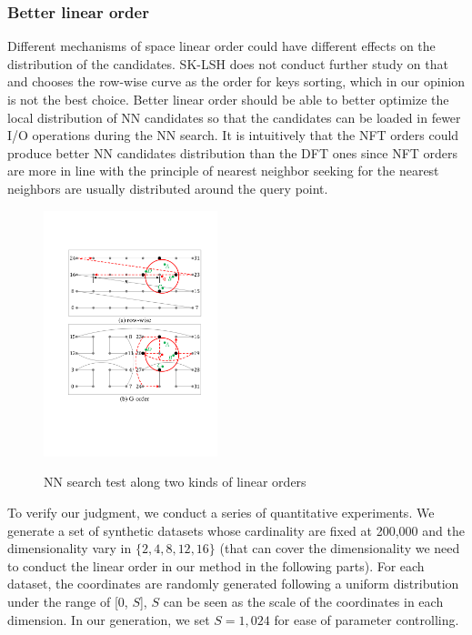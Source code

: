 \documentclass[twocolumn]{svjour3}          %
\begin{document}
\subsubsection{Better linear order}\label{sssec:anaorder}
Different mechanisms of space linear order could have different effects on the distribution of the candidates. SK-LSH does not conduct further study on that and chooses the row-wise curve as the order for keys sorting, which in our opinion is not the best choice. Better linear order should be able to better optimize the local distribution of NN candidates so that the candidates can be loaded in fewer I/O operations during the NN search. It is intuitively that the NFT orders could produce better NN candidates distribution than the DFT ones since NFT orders are more in line with the principle of nearest neighbor seeking for the nearest neighbors are usually distributed around the query point.
\begin{figure}[t]
	\centering
	\includegraphics[width=0.45\textwidth]{order-compare.pdf}\\
	\caption{NN search test along two kinds of linear orders}\label{fig:nncompare}
\end{figure}

To verify our judgment, we conduct a series of quantitative experiments.
We generate a set of synthetic datasets whose cardinality are fixed at 200,000 and the dimensionality vary in $\{2,4,8,12,16\}$ (that can cover the dimensionality we need to conduct the linear order in our method in the following parts). For each dataset, the coordinates are randomly generated following a uniform distribution under the range of [0, $S$], $S$ can be seen as the scale of the coordinates in each dimension. In our generation, we set $S=1,024$ for ease of parameter controlling. 
\end{document}
